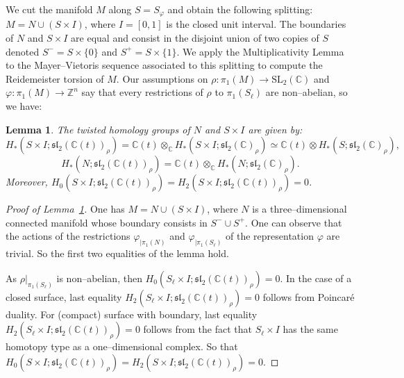 \documentclass[a4paper]{amsart}
\theoremstyle{plain}
\newtheorem{lemma}[theorem]{Lemma}%
\theoremstyle{definition}
\theoremstyle{remark}
\newcommand{\ZZ}{{\mathbb Z}}
\newcommand{\CC}{{\mathbb C}}
\newcommand{\SL}{{\mathrm{SL}_2(\CC)}}
\newcommand{\sllrho}{\mathfrak{sl}_2(\CC)_\rho}
\newcommand{\sllrhot}{\mathfrak{sl}_2(\CC(t))_\rho}
\begin{document}
We cut the manifold $M$ along $S = S_\varphi$ and obtain the following splitting:
$M = N \cup (S \times I)$, where $I= [0,1]$ is the closed unit
interval. The boundaries of $N$ and $S \times I$ are equal and consist
in the disjoint union of two copies of $S$ denoted $S^- = S \times
\{0\}$ and $S^+ = S \times \{1\}$. We apply the Multiplicativity Lemma
to the Mayer--Vietoris sequence associated to this splitting to compute
the Reidemeister torsion of $M$. Our assumptions on $\rho \colon
\pi_1(M) \to \SL$ and $\varphi \colon \pi_1(M) \to \ZZ^n$ say that
every restrictions of $\rho$ to $\pi_1(S_\ell)$ are non--abelian,
so we have:
\begin{lemma}\label{lemma:twist-H}
  The twisted homology groups of $N$ and $S \times I$ are given by:
  \[
  H_*(S \times I; \sllrhot) = \CC(t) \otimes_\CC H_*(S \times
  I;\sllrho) \simeq \CC(t) \otimes H_*(S; \sllrho),
  \]
  \[
  H_*(N; \sllrhot) = \CC(t) \otimes_\CC H_*(N; \sllrho).
  \]
  Moreover, $H_0(S \times I; \sllrhot) = H_2(S \times I; \sllrhot) =
  0$.
\end{lemma}
\begin{proof}[Proof of Lemma~\ref{lemma:twist-H}]
  One has $M = N \cup (S \times I)$, where $N$ is a three--dimensional
  connected manifold whose boundary consists in $S^- \cup S^+$.  One
  can observe that the actions of the restrictions
  $\varphi_{|\pi_1(N)}$ and $\varphi_{|\pi_1(S_\ell)}$ of the
  representation $\varphi$ are trivial. So the first two equalities of the
  lemma hold.
  
  As $\rho|_{\pi_1(S_\ell)}$ is
  non--abelian, then $H_0(S_\ell \times I; \sllrhot) = 0$. In the case of a closed surface,
 last equality $H_2(S_\ell \times I; \sllrhot) = 0$ follows from Poincar\'e duality. For (compact) surface with boundary, last equality $H_2(S_\ell \times I; \sllrhot) = 0$ follows from the fact that $S_\ell \times I$ has the same homotopy type as a one--dimensional complex. So that $H_0(S \times I; \sllrhot) = H_2(S \times I; \sllrhot) = 0$.
\end{proof}
\end{document}
